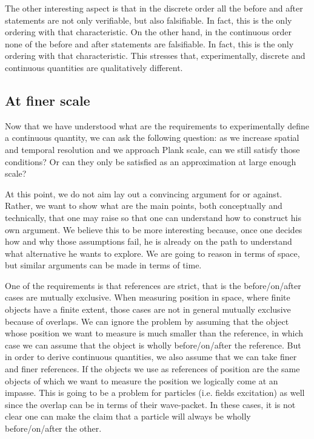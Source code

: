 \documentclass{article}
\begin{document}
The other interesting aspect is that in the discrete order all the before and after statements are not only verifiable, but also falsifiable. In fact, this is the only ordering with that characteristic. On the other hand, in the continuous order none of the before and after statements are falsifiable. In fact, this is the only ordering with that characteristic. This stresses that, experimentally, discrete and continuous quantities are qualitatively different.

\subsection*{At finer scale}

Now that we have understood what are the requirements to experimentally define a continuous quantity, we can ask the following question: as we increase spatial and temporal resolution and we approach Plank scale, can we still satisfy those conditions? Or can they only be satisfied as an approximation at large enough scale?

At this point, we do not aim lay out a convincing argument for or against. Rather, we want to show what are the main points, both conceptually and technically, that one may raise so that one can understand how to construct his own argument. We believe this to be more interesting because, once one decides how and why those assumptions fail, he is already on the path to understand what alternative he wants to explore. We are going to reason in terms of space, but similar arguments can be made in terms of time.

One of the requirements is that references are strict, that is the before/on/after cases are mutually exclusive. When measuring position in space, where finite objects have a finite extent, those cases are not in general mutually exclusive because of overlaps. We can ignore the problem by assuming that the object whose position we want to measure is much smaller than the reference, in which case we can assume that the object is wholly before/on/after the reference. But in order to derive continuous quantities, we also assume that we can take finer and finer references. If the objects we use as references of position are the same objects of which we want to measure the position we logically come at an impasse. This is going to be a problem for particles (i.e. fields excitation) as well since the overlap can be in terms of their wave-packet. In these cases, it is not clear one can make the claim that a particle will always be wholly before/on/after the other.
\end{document}
